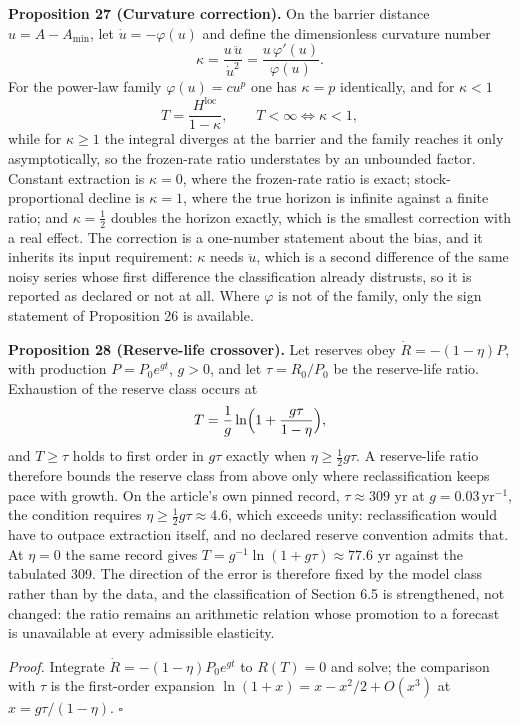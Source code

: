 \documentclass[11pt]{article}
\begin{document}
\textbf{Proposition 27 (Curvature correction).} On the barrier distance \(u=A-A_{\min}\), let
\(\dot u=-\varphi(u)\) and define the dimensionless curvature number
\[ \kappa=\frac{u\,\ddot u}{\dot u^{2}}=\frac{u\,\varphi'(u)}{\varphi(u)} . \]
For the power-law family \(\varphi(u)=cu^{p}\) one has \(\kappa=p\) identically, and for \(\kappa<1\)
\[ T=\frac{H^{\mathrm{loc}}}{1-\kappa}, \qquad T<\infty\iff\kappa<1, \]
while for \(\kappa\ge1\) the integral diverges at the barrier and the family reaches it only
asymptotically, so the frozen-rate ratio understates by an unbounded factor. Constant extraction is
\(\kappa=0\), where the frozen-rate ratio is exact; stock-proportional decline is \(\kappa=1\),
where the true horizon is infinite against a finite ratio; and \(\kappa=\tfrac12\) doubles the
horizon exactly, which is the smallest correction with a real effect. The correction is a one-number
statement about the bias, and it inherits its input requirement: \(\kappa\) needs \(\ddot u\), which
is a second difference of the same noisy series whose first difference the classification already
distrusts, so it is reported as declared or not at all. Where \(\varphi\) is not of the family, only
the sign statement of Proposition 26 is available.

\textbf{Proposition 28 (Reserve-life crossover).} Let reserves obey \(\dot R=-(1-\eta)P\), with
production \(P=P_0e^{gt}\), \(g>0\), and let \(\tau=R_0/P_0\) be the reserve-life ratio. Exhaustion of
the reserve class occurs at
\[ T=\frac1g\ln\Bigl(1+\frac{g\tau}{1-\eta}\Bigr), \]
and \(T\ge\tau\) holds to first order in \(g\tau\) exactly when \(\eta\ge\tfrac12g\tau\). A
reserve-life ratio therefore bounds the reserve class from above only where reclassification keeps
pace with growth. On the article's own pinned record, \(\tau\approx309\) yr at
\(g=0.03\,\mathrm{yr}^{-1}\), the condition requires \(\eta\ge\tfrac12g\tau\approx4.6\), which
exceeds unity: reclassification would have to outpace extraction itself, and no declared reserve
convention admits that. At \(\eta=0\) the same record gives \(T=g^{-1}\ln(1+g\tau)\approx77.6\) yr
against the tabulated 309. The direction of the error is therefore fixed by the model class rather
than by the data, and the classification of Section 6.5 is strengthened, not changed: the ratio
remains an arithmetic relation whose promotion to a forecast is unavailable at every admissible
elasticity.

\emph{Proof.} Integrate \(\dot R=-(1-\eta)P_0e^{gt}\) to \(R(T)=0\) and solve; the comparison with \(\tau\)
is the first-order expansion \(\ln(1+x)=x-x^2/2+O(x^3)\) at \(x=g\tau/(1-\eta)\). \ensuremath{\square}
\end{document}
